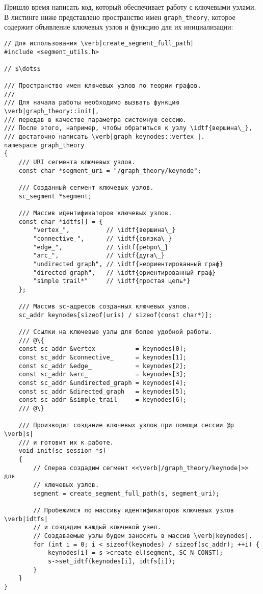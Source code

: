 Пришло время написать код, который обеспечивает работу с ключевыми
узлами. В листинге ниже представлено пространство имен
\lstinline|graph_theory|, которое содержит объявление ключевых узлов и
функцию для их инициализации:
\begin{lstlisting}[texcl]
// Для использования \verb|create_segment_full_path|
#include <segment_utils.h>

// $\dots$

/// Пространство имен ключевых узлов по теории графов.
///
/// Для начала работы необходимо вызвать функцию \verb|graph_theory::init|,
/// передав в качестве параметра системную сессию.
/// После этого, например, чтобы обратиться к узлу \idtf{вершина\_},
/// достаточно написать \verb|graph_keynodes::vertex_|.
namespace graph_theory
{
    /// URI сегмента ключевых узлов.
    const char *segment_uri = "/graph_theory/keynode";

    /// Созданный сегмент ключевых узлов.
    sc_segment *segment;

    /// Массив идентификаторов ключевых узлов.
    const char *idtfs[] = {
        "vertex_",          // \idtf{вершина\_}
        "connective_",      // \idtf{связка\_}
        "edge_",            // \idtf{ребро\_}
        "arc_",             // \idtf{дуга\_}
        "undirected graph", // \idtf{неориентированный граф}
        "directed graph",   // \idtf{ориентированный граф}
        "simple trail*"     // \idtf{простая цепь*}
    };

    /// Массив sc-адресов созданных ключевых узлов.
    sc_addr keynodes[sizeof(uris) / sizeof(const char*)];

    /// Ссылки на ключевые узлы для более удобной работы.
    /// @\{
    const sc_addr &vertex           = keynodes[0];
    const sc_addr &connective_      = keynodes[1];
    const sc_addr &edge_            = keynodes[2];
    const sc_addr &arc_             = keynodes[3];
    const sc_addr &undirected_graph = keynodes[4];
    const sc_addr &directed_graph   = keynodes[5];
    const sc_addr &simple_trail     = keynodes[6];
    /// @\}

    /// Производит создание ключевых узлов при помощи сессии @p \verb|s|
    /// и готовит их к работе.
    void init(sc_session *s)
    {
        // Сперва создадим сегмент <<\verb|/graph_theory/keynode|>> для
        // ключевых узлов.
        segment = create_segment_full_path(s, segment_uri);

        // Пробежимся по массиву идентификаторов ключевых узлов \verb|idtfs|
        // и создадим каждый ключевой узел.
        // Создаваемые узлы будем заносить в массив \verb|keynodes|.
        for (int i = 0; i < sizeof(keynodes) / sizeof(sc_addr); ++i) {
            keynodes[i] = s->create_el(segment, SC_N_CONST);
            s->set_idtf(keynodes[i], idtfs[i]);
        }
    }
}
\end{lstlisting}

